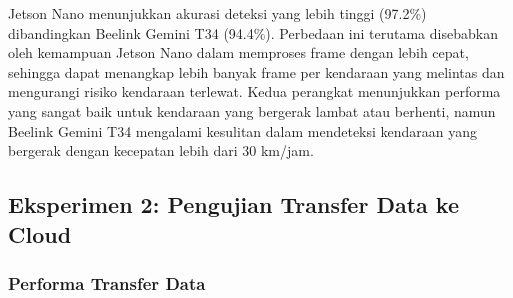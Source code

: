 Jetson Nano menunjukkan akurasi deteksi yang lebih tinggi (97.2\%) dibandingkan Beelink Gemini T34 (94.4\%). Perbedaan ini terutama disebabkan oleh kemampuan Jetson Nano dalam memproses frame dengan lebih cepat, sehingga dapat menangkap lebih banyak frame per kendaraan yang melintas dan mengurangi risiko kendaraan terlewat. Kedua perangkat menunjukkan performa yang sangat baik untuk kendaraan yang bergerak lambat atau berhenti, namun Beelink Gemini T34 mengalami kesulitan dalam mendeteksi kendaraan yang bergerak dengan kecepatan lebih dari 30 km/jam.

\subsection{Eksperimen 2: Pengujian Transfer Data ke Cloud}
\label{sec:eksperimen2}


\subsubsection{Performa Transfer Data}




